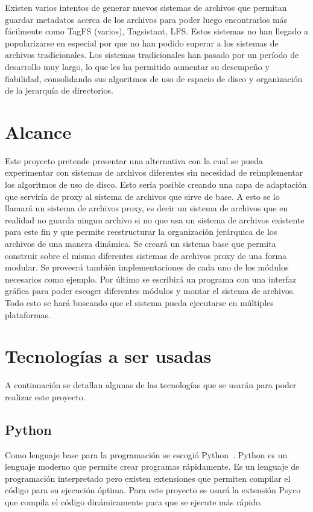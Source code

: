 Existen varios intentos de generar nuevos sistemas de archivos que permitan guardar metadatos acerca de los archivos para poder luego encontrarlos más fácilmente como TagFS (varios), Tagsistant, LFS. Estos sistemas no han llegado a popularizarse en especial por que no han podido superar a los sistemas de archivos tradicionales. Los sistemas tradicionales han pasado por un período de desarrollo muy largo, lo que les ha permitido aumentar su desempeño y fiabilidad, consolidando sus algoritmos de uso de espacio de disco y organización de la jerarquía de directorios.


\section{Alcance}

Este proyecto pretende presentar una alternativa con la cual se pueda experimentar con sistemas de archivos diferentes sin necesidad de reimplementar los algoritmos de uso de disco. Esto sería posible creando una capa de adaptación que serviría de proxy al sistema de archivos que sirve de base. A esto se lo llamará un sistema de archivos proxy, es decir un sistema de archivos que en realidad no guarda ningun archivo si no que usa un sistema de archivos existente para este fin y que permite reestructurar la organización jerárquica de los archivos de una manera dinámica. Se creará un sistema base que permita construir sobre el mismo diferentes sistemas de archivos proxy de una forma modular. Se proveerá también implementaciones de cada uno de los módulos necesarios como ejemplo. Por último se escribirá un programa con una interfaz gráfica para poder escoger diferentes módulos y montar el sistema de archivos. Todo esto se hará buscando que el sistema pueda ejecutarse en múltiples plataformas.


\section{Tecnologías a ser usadas}

A continuación se detallan algunas de las tecnologías que se usarán para poder realizar este proyecto.

\subsection{Python}

Como lenguaje base para la programación se escogió Python~\cite{python:website}. Python es un lenguaje moderno que permite crear programas rápidamente. Es un lenguaje de programación interpretado pero existen extensiones que permiten compilar el código para su ejecución óptima. Para este proyecto se usará la extensión Psyco~\cite{psyco:website} que compila el código dinámicamente para que se ejecute más rápido.

